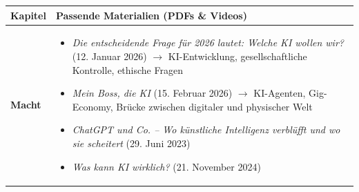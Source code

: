 \footnotesize
\begin{longtable}{@{}lp{14cm}@{}}
	\toprule
	\textbf{Kapitel} & \textbf{Passende Materialien (PDFs \& Videos)} \\
	\midrule\midrule

	\textbf{Macht} &
	\begin{itemize}[leftmargin=*,noitemsep,topsep=0pt]
		\item[\faFilePdf{}] \textit{Die entscheidende Frage für 2026 lautet: Welche KI wollen wir?} (12. Januar 2026) \newline
		$\rightarrow$ KI-Entwicklung, gesellschaftliche Kontrolle, ethische Fragen
		\item[\faFilePdf{}] \textit{Mein Boss, die KI} (15. Februar 2026) \newline
		$\rightarrow$ KI-Agenten, Gig-Economy, Brücke zwischen digitaler und physischer Welt
		\item[\faPlayCircle{}] \textit{ChatGPT und Co. -- Wo künstliche Intelligenz verblüfft und wo sie scheitert} (29. Juni 2023) \href{https://www.srf.ch/play/tv/einstein/video/chatgpt-und-co----wo-kuenstliche-intelligenz-verbluefft-und-wo-sie-scheitert?urn=urn:srf:video:3c267144-f388-4474-83fc-a8d09676c94a}{\faLink}
		\item[\faPlayCircle{}] \textit{Was kann KI wirklich?} (21. November 2024) \href{https://www.srf.ch/play/tv/einstein/video/was-kann-ki-wirklich?urn=urn:srf:video:9c65b2f1-abaa-4583-9ddf-17e1a7743c2d}{\faLink}
	\end{itemize} \\
	\midrule


\end{longtable}
